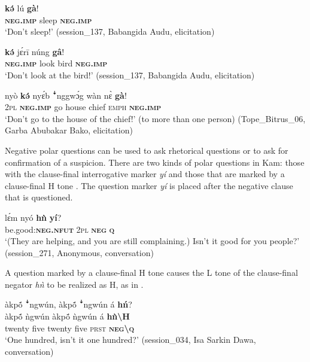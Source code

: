 \documentclass[output=paper,colorlinks,citecolor=brown]{langscibook}
\begin{document}
\ea\label{ex:kam:33} 
    \gll \textbf{kə́} lú \textbf{gà}!\\
        \textbf{\textsc{neg}}\textbf{.\textsc{imp}} sleep \textbf{\textsc{neg}}\textbf{.\textsc{imp}}\\
    \glt ‘Don’t sleep!’ (session\_137, Babangida Audu, elicitation)
\z

\ea\label{ex:kam:34} 
    \gll \textbf{kə́} jɛ́rī núng \textbf{gâ}!\\
        \textbf{\textsc{neg}}\textbf{.\textsc{imp}} look bird \textbf{\textsc{neg}}\textbf{.\textsc{imp}}\\
    \glt ‘Don’t look at the bird!’ (session\_137, Babangida Audu, elicitation)
\z 

\ea\label{ex:kam:35} 
    \gll nyò \textbf{kə́} nyɛ́b ꜜnggwɔ́g wàn nɛ̀ \textbf{gà}!\\
        \textsc{2pl} \textbf{\textsc{neg}}\textbf{.\textsc{imp}} go house chief \textsc{emph} \textbf{\textsc{neg}}\textbf{.\textsc{imp}}\\
    \glt ‘Don’t go to the house of the chief!’ (to more than one person) (Tope\_Bitrus\_06, Garba Abubakar Bako, elicitation) 
\z 

Negative polar questions can be used to ask rhetorical questions or to ask for confirmation of a suspicion. There are two kinds of polar questions in Kam: those with the clause-final interrogative marker \textit{yí}  and those that are marked by a clause-final H tone . The question marker \textit{yí} is placed after the negative clause that is questioned.

\ea\label{ex:kam:36} 
    \gll lɛ́m nyó \textbf{hǹ} \textbf{yí}?\\
            be.good:\textbf{\textsc{neg}}\textbf{.\textsc{nfut}} \textsc{2pl} \textbf{\textsc{neg}} \textbf{\textsc{q}}\\
    \glt ‘(They are helping, and you are still complaining.) Isn’t it good for you people?’ (session\_271, Anonymous, conversation)
\z 

A question marked by a clause-final H tone causes the L tone of the clause-final negator \textit{hǹ} to be realized as H, as in .

\ea\label{ex:kam:37} 
    \glll àkp\'{õ}  ꜜngwún, àkp\'{õ}  ꜜngwún á \textbf{hń}?\\
        àkp\'{õ}  ǹgwún àkp\'{õ}  ǹgwún á \textbf{hǹ{\textbackslash}H}\\
        twenty five twenty five \textsc{prst} \textbf{\textsc{neg}}\textbf{{\textbackslash}}\textbf{\textsc{q}}\\
    \glt ‘One hundred, isn't it one hundred?’ (session\_034, Isa Sarkin Dawa, conversation)
\z 
\end{document}
